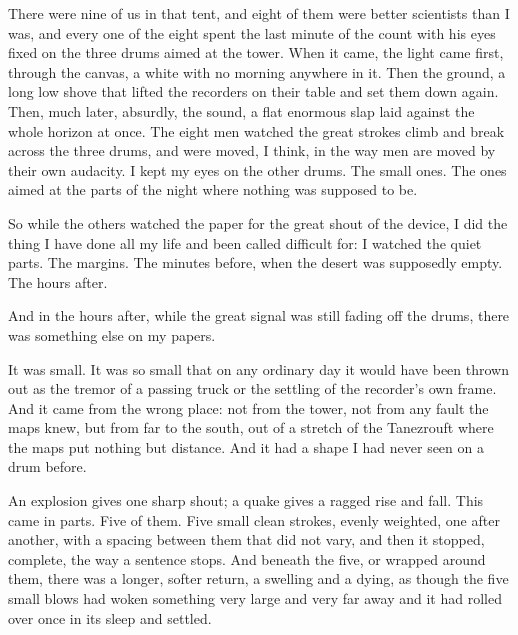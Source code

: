 There were nine of us in that tent, and eight of them were better scientists than I was, and every one of the eight spent the last minute of the count with his eyes fixed on the three drums aimed at the tower. When it came, the light came first, through the canvas, a white with no morning anywhere in it. Then the ground, a long low shove that lifted the recorders on their table and set them down again. Then, much later, absurdly, the sound, a flat enormous slap laid against the whole horizon at once. The eight men watched the great strokes climb and break across the three drums, and were moved, I think, in the way men are moved by their own audacity. I kept my eyes on the other drums. The small ones. The ones aimed at the parts of the night where nothing was supposed to be.\par

So while the others watched the paper for the great shout of the device, I did the thing I have done all my life and been called difficult for: I watched the quiet parts. The margins. The minutes before, when the desert was supposedly empty. The hours after.\par

And in the hours after, while the great signal was still fading off the drums, there was something else on my papers.\par

It was small. It was so small that on any ordinary day it would have been thrown out as the tremor of a passing truck or the settling of the recorder's own frame. And it came from the wrong place: not from the tower, not from any fault the maps knew, but from far to the south, out of a stretch of the Tanezrouft where the maps put nothing but distance. And it had a shape I had never seen on a drum before.\par

An explosion gives one sharp shout; a quake gives a ragged rise and fall. This came in parts. Five of them. Five small clean strokes, evenly weighted, one after another, with a spacing between them that did not vary, and then it stopped, complete, the way a sentence stops. And beneath the five, or wrapped around them, there was a longer, softer return, a swelling and a dying, as though the five small blows had woken something very large and very far away and it had rolled over once in its sleep and settled.\par

